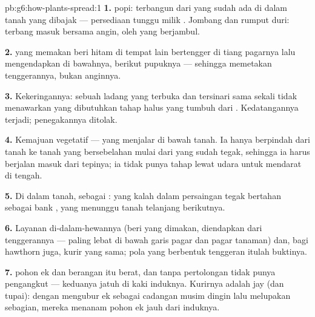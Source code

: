 \begin{solution}{pb:g6:how-plants-spread:1}
\textbf{1.}  popi: terbangun dari  yang sudah ada di dalam
tanah yang dibajak --- persediaan tunggu milik .
Jombang dan rumput duri: terbang masuk bersama angin, oleh 
yang berjambul.

\textbf{2.}  yang memakan beri hitam di tempat lain bertengger
di tiang pagarnya lalu mengendapkan  di bawahnya, berikut
pupuknya --- sehingga  memetakan tenggerannya, bukan
anginnya.

\textbf{3.} Kekeringannya: sebuah ladang yang terbuka dan tersinari
sama sekali tidak menawarkan  yang dibutuhkan tahap halus
 yang tumbuh dari . Kedatangannya terjadi;
penegakannya ditolak.

\textbf{4.} Kemajuan vegetatif ---  yang menjalar di bawah
tanah. Ia hanya berpindah dari tanah ke tanah yang bersebelahan mulai
dari  yang sudah tegak, sehingga ia harus berjalan masuk dari
tepinya; ia tidak punya tahap lewat udara untuk mendarat di tengah.

\textbf{5.} Di dalam tanah, sebagai :  yang kalah
dalam persaingan tegak bertahan sebagai bank , yang menunggu tanah
telanjang berikutnya.

\textbf{6.} Layanan di-dalam-hewannya (beri yang dimakan, 
diendapkan dari tenggerannya --- paling lebat di bawah garis pagar dan
pagar tanaman) dan, bagi hawthorn juga, kurir  yang sama; pola
yang berbentuk tenggeran itulah buktinya.

\textbf{7.}  pohon ek dan berangan itu berat, dan tanpa
pertolongan tidak punya pengangkut --- keduanya jatuh di kaki
induknya. Kurirnya adalah  jay (dan tupai): dengan mengubur 
ek sebagai cadangan musim dingin lalu melupakan sebagian, mereka
menanam pohon ek jauh dari induknya.


\end{solution}
